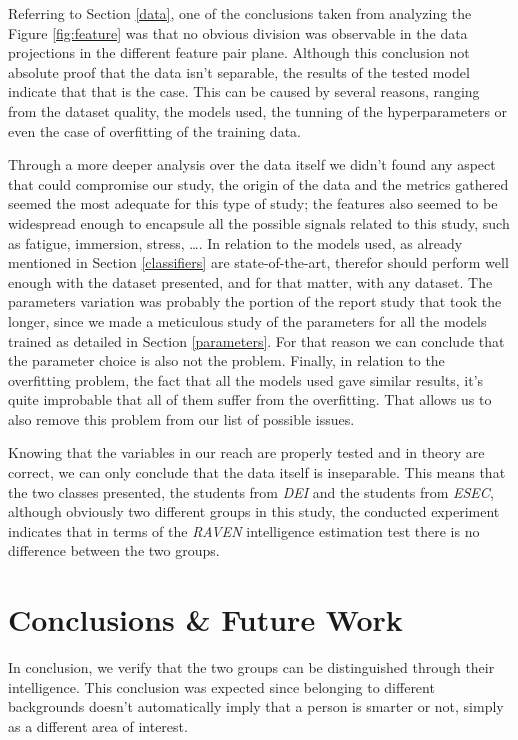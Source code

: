 \documentclass[conference]{IEEEtran}
\begin{document}
Referring to Section \ref{data}, one of the conclusions taken from analyzing the Figure \ref{fig:feature} was that no obvious division was observable in the data projections in the different feature pair plane. Although this conclusion not absolute proof that the data isn't separable, the results of the tested model indicate that that is the case. This can be caused by several reasons, ranging from the dataset quality, the models used, the tunning of the hyperparameters or even the case of overfitting of the training data. 

Through a more deeper analysis over the data itself we didn't found any aspect that could compromise our study, the origin of the data and the metrics gathered seemed the most adequate for this type of study; the features also seemed to be widespread enough to encapsule all the possible signals related to this study, such as fatigue, immersion, stress, \dots. In relation to the models used, as already mentioned in Section \ref{classifiers} are state-of-the-art, therefor should perform well enough with the dataset presented, and for that matter, with any dataset. The parameters variation was probably the portion of the report study that took the longer, since we made a meticulous study of the parameters for all the models trained as detailed in Section \ref{parameters}. For that reason we can conclude that the parameter choice is also not the problem. Finally, in relation to the overfitting problem, the fact that all the models used gave similar results, it's quite improbable that all of them suffer from the overfitting. That allows us to also remove this problem from our list of possible issues.

Knowing that the variables in our reach are properly tested and in theory are correct, we can only conclude that the data itself is inseparable. This means that the two classes presented, the students from \textit{DEI} and the students from \textit{ESEC}, although obviously two different groups in this study, the conducted experiment indicates that in terms of the \textit{RAVEN} intelligence estimation test there is no difference between the two groups.

\section{Conclusions \& Future Work}
In conclusion, we verify that the two groups can be distinguished through their intelligence. This conclusion was expected since belonging to different backgrounds doesn't automatically imply that a person is smarter or not, simply as a different area of interest.
\end{document}
